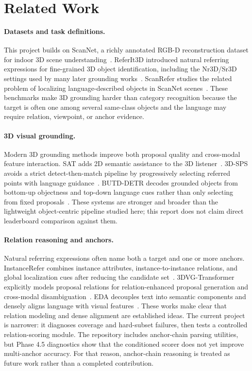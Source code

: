 \section{Related Work}

\paragraph{Datasets and task definitions.}
This project builds on ScanNet, a richly annotated RGB-D reconstruction dataset for indoor 3D scene understanding~\citep{dai2017scannet}. ReferIt3D introduced natural referring expressions for fine-grained 3D object identification, including the Nr3D/Sr3D settings used by many later grounding works~\citep{achlioptas2020referit3d}. ScanRefer studies the related problem of localizing language-described objects in ScanNet scenes~\citep{chen2020scanrefer}. These benchmarks make 3D grounding harder than category recognition because the target is often one among several same-class objects and the language may require relation, viewpoint, or anchor evidence.

\paragraph{3D visual grounding.}
Modern 3D grounding methods improve both proposal quality and cross-modal feature interaction. SAT adds 2D semantic assistance to the 3D listener~\citep{yang2021sat}. 3D-SPS avoids a strict detect-then-match pipeline by progressively selecting referred points with language guidance~\citep{luo2022sps}. BUTD-DETR decodes grounded objects from bottom-up objectness and top-down language cues rather than only selecting from fixed proposals~\citep{jain2022butd}. These systems are stronger and broader than the lightweight object-centric pipeline studied here; this report does not claim direct leaderboard comparison against them.

\paragraph{Relation reasoning and anchors.}
Natural referring expressions often name both a target and one or more anchors. InstanceRefer combines instance attributes, instance-to-instance relations, and global localization cues after reducing the candidate set~\citep{yuan2021instancerefer}. 3DVG-Transformer explicitly models proposal relations for relation-enhanced proposal generation and cross-modal disambiguation~\citep{zhao2021_3DVG_Transformer}. EDA decouples text into semantic components and densely aligns language with visual features~\citep{wu2023eda}. These works make clear that relation modeling and dense alignment are established ideas. The current project is narrower: it diagnoses coverage and hard-subset failures, then tests a controlled relation-scoring module. The repository includes anchor-chain parsing utilities, but Phase 4.5 diagnostics show that the conditioned scorer does not yet improve multi-anchor accuracy. For that reason, anchor-chain reasoning is treated as future work rather than a completed contribution.

